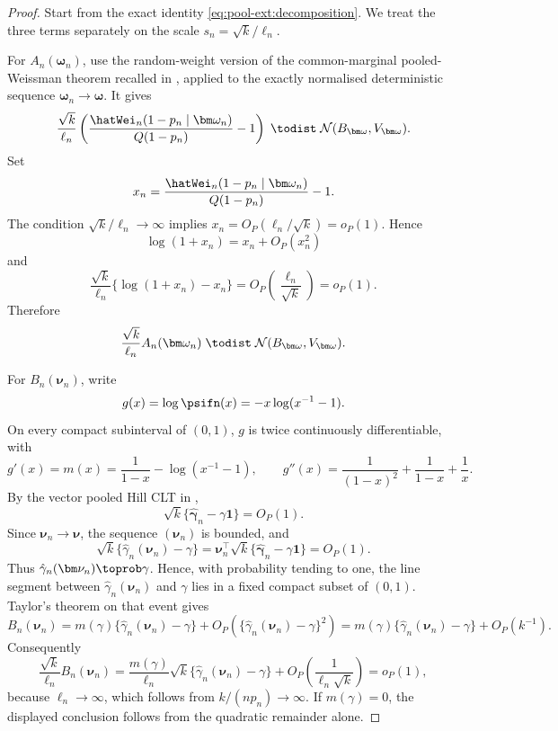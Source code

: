 \begin{proof}
Start from the exact identity
\eqref{eq:pool-ext:decomposition}. We treat the three terms separately on the
scale \(s_n=\sqrt{k}/\ell_n\).

For \(A_n(\bm\omega_n)\), use the random-weight version of the
common-marginal pooled-Weissman theorem recalled in
, applied to the exactly normalised
deterministic sequence \(\bm\omega_n\to\bm\omega\). It gives
\[
  \frac{\sqrt{k}}{\ell_n}
  \left(
    \frac{\hatWei_n(1-p_n\mid\bm\omega_n)}{Q(1-p_n)}-1
  \right)
  \;\todist\;
  \mathcal N(B_{\bm\omega},V_{\bm\omega}).
\]
Set
\[
  x_n
  =
  \frac{\hatWei_n(1-p_n\mid\bm\omega_n)}{Q(1-p_n)}-1.
\]
The condition \(\sqrt{k}/\ell_n\to\infty\) implies
\(x_n=O_P(\ell_n/\sqrt{k})=o_P(1)\). Hence
\[
  \log(1+x_n)=x_n+O_P(x_n^2)
\]
and
\[
  \frac{\sqrt{k}}{\ell_n}
  \{\log(1+x_n)-x_n\}
  =
  O_P\!\left(\frac{\ell_n}{\sqrt{k}}\right)
  =
  o_P(1).
\]
Therefore
\begin{equation}
\label{eq:pool-ext:A-limit}
  \frac{\sqrt{k}}{\ell_n}A_n(\bm\omega_n)
  \;\todist\;
  \mathcal N(B_{\bm\omega},V_{\bm\omega}).
\end{equation}

For \(B_n(\bm\nu_n)\), write
\[
  g(x)=\log\psifn(x)=-x\log(x^{-1}-1).
\]
On every compact subinterval of \((0,1)\), \(g\) is twice continuously
differentiable, with
\[
  g'(x)=m(x)
  =
  \frac{1}{1-x}-\log(x^{-1}-1),
  \qquad
  g''(x)
  =
  \frac{1}{(1-x)^2}+\frac{1}{1-x}+\frac{1}{x}.
\]
By the vector pooled Hill CLT in ,
\[
  \sqrt{k}\{\hat{\bm\gamma}_n-\gamma\bm 1\}=O_P(1).
\]
Since \(\bm\nu_n\to\bm\nu\), the sequence \((\bm\nu_n)\) is bounded, and
\[
  \sqrt{k}\{\hat\gamma_n(\bm\nu_n)-\gamma\}
  =
  \bm\nu_n^\top
  \sqrt{k}\{\hat{\bm\gamma}_n-\gamma\bm 1\}
  =
  O_P(1).
\]
Thus \(\hat\gamma_n(\bm\nu_n)\toprob\gamma\). Hence, with probability tending
to one, the line segment between \(\hat\gamma_n(\bm\nu_n)\) and \(\gamma\)
lies in a fixed compact subset of \((0,1)\). Taylor's theorem on that event
gives
\[
  B_n(\bm\nu_n)
  =
  m(\gamma)\{\hat\gamma_n(\bm\nu_n)-\gamma\}
  +
  O_P\!\left(\{\hat\gamma_n(\bm\nu_n)-\gamma\}^2\right)
  =
  m(\gamma)\{\hat\gamma_n(\bm\nu_n)-\gamma\}+O_P(k^{-1}).
\]
Consequently
\begin{equation}
\label{eq:pool-ext:B-negligible}
  \frac{\sqrt{k}}{\ell_n}B_n(\bm\nu_n)
  =
  \frac{m(\gamma)}{\ell_n}
  \sqrt{k}\{\hat\gamma_n(\bm\nu_n)-\gamma\}
  +
  O_P\!\left(\frac{1}{\ell_n\sqrt{k}}\right)
  =
  o_P(1),
\end{equation}
because \(\ell_n\to\infty\), which follows from \(k/(np_n)\to\infty\). If
\(m(\gamma)=0\), the displayed conclusion follows from the quadratic remainder
alone.


\end{proof}
